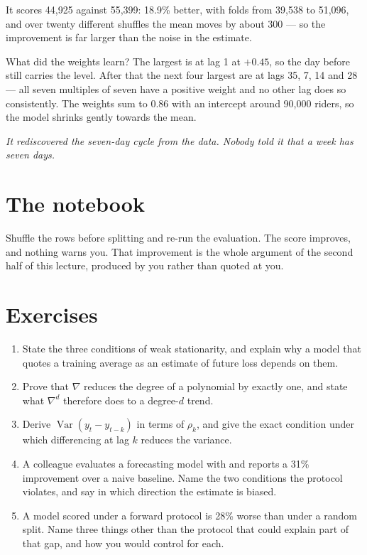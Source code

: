 \documentclass[11pt,a4paper]{article}
\begin{document}
It scores 44{,}925 against 55{,}399: 18.9\% better, with folds from 39{,}538 to
51{,}096, and over twenty different shuffles the mean moves by about 300 --- so
the improvement is far larger than the noise in the estimate.

What did the weights learn? The largest is at lag 1 at $+0.45$, so the day
before still carries the level. After that the next four largest are at lags
35, 7, 14 and 28 --- all seven multiples of seven have a positive weight and no
other lag does so consistently. The weights sum to 0.86 with an intercept
around 90{,}000 riders, so the model shrinks gently towards the mean.

\emph{It rediscovered the seven-day cycle from the data. Nobody told it that a
week has seven days.}

\section{The notebook}

\begin{trybox}[title={What to change}]
Shuffle the rows before splitting and re-run the evaluation. The score
improves, and nothing warns you. That improvement is the whole argument of the
second half of this lecture, produced by you rather than quoted at you.
\end{trybox}

\section{Exercises}

\begin{enumerate}[leftmargin=1.6em,itemsep=4pt]
  \item State the three conditions of weak stationarity, and explain why a
        model that quotes a training average as an estimate of future loss
        depends on them. \hfill \scope{[5]}
  \item Prove that $\nabla$ reduces the degree of a polynomial by exactly one,
        and state what $\nabla^d$ therefore does to a degree-$d$ trend.
        \hfill \scope{[4]}
  \item Derive $\operatorname{Var}(y_t - y_{t-k})$ in terms of $\rho_k$, and
        give the exact condition under which differencing at lag $k$ reduces
        the variance. \hfill \scope{[5]}
  \item A colleague evaluates a forecasting model with
         and reports a 31\% improvement over a naive
        baseline. Name the two conditions the protocol violates, and say in
        which direction the estimate is biased. \hfill \scope{[4]}
  \item A model scored under a forward protocol is 28\% worse than under a
        random split. Name three things other than the protocol that could
        explain part of that gap, and how you would control for each.
        \hfill \scope{[4]}
\end{enumerate}
\end{document}
